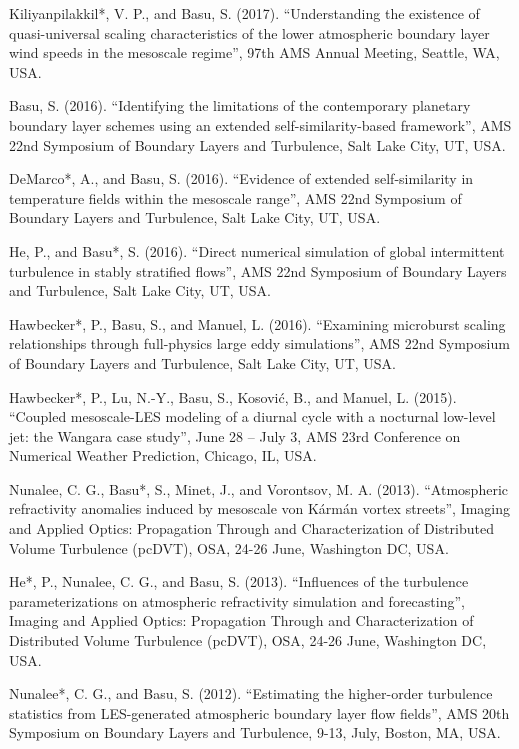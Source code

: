 \begin{etaremune}[topsep=0pt,itemsep=0pt,partopsep=0pt,parsep=0pt]
\item Kiliyanpilakkil*, V. P., and Basu, S. (2017). ``Understanding the existence of quasi-universal scaling characteristics of the lower atmospheric boundary layer wind speeds in the mesoscale regime'', 97th AMS Annual Meeting, Seattle, WA, USA. 
\item Basu, S. (2016). ``Identifying the limitations of the contemporary planetary boundary layer schemes using an extended self-similarity-based framework'', AMS 22nd Symposium of Boundary Layers and Turbulence, Salt Lake City, UT, USA.
\item DeMarco*, A., and Basu, S. (2016). ``Evidence of extended self-similarity in temperature fields within the mesoscale range'', AMS 22nd Symposium of Boundary Layers and Turbulence, Salt Lake City, UT, USA.
\item He, P., and Basu*, S. (2016). ``Direct numerical simulation of global intermittent turbulence in stably stratified flows'', AMS 22nd Symposium of Boundary Layers and Turbulence, Salt Lake City, UT, USA.
\item Hawbecker*, P., Basu, S., and Manuel, L. (2016). ``Examining microburst scaling relationships through full-physics large eddy simulations'', AMS 22nd Symposium of Boundary Layers and Turbulence, Salt Lake City, UT, USA.
\item Hawbecker*, P., Lu, N.-Y., Basu, S., Kosovi\'{c}, B., and Manuel, L. (2015). ``Coupled mesoscale-LES modeling of a diurnal cycle with a nocturnal low-level jet: the Wangara case study'', June 28 – July 3, AMS 23rd Conference on Numerical Weather Prediction, Chicago, IL, USA.
\item Nunalee, C. G., Basu*, S., Minet, J., and Vorontsov, M. A. (2013). ``Atmospheric refractivity anomalies induced by mesoscale von K\'{a}rm\'{a}n vortex streets'', Imaging and Applied Optics: Propagation Through and Characterization of Distributed Volume Turbulence (pcDVT), OSA, 24-26 June, Washington DC, USA.
\item He*, P., Nunalee, C. G., and Basu, S. (2013). ``Influences of the turbulence parameterizations on atmospheric refractivity simulation and forecasting'', Imaging and Applied Optics: Propagation Through and Characterization of Distributed Volume Turbulence (pcDVT), OSA, 24-26 June, Washington DC, USA.
\item Nunalee*, C. G., and Basu, S. (2012). ``Estimating the higher-order turbulence statistics from LES-generated atmospheric boundary layer flow fields'', AMS 20th Symposium on Boundary Layers and Turbulence, 9-13, July, Boston, MA, USA.

\end{etaremune}
